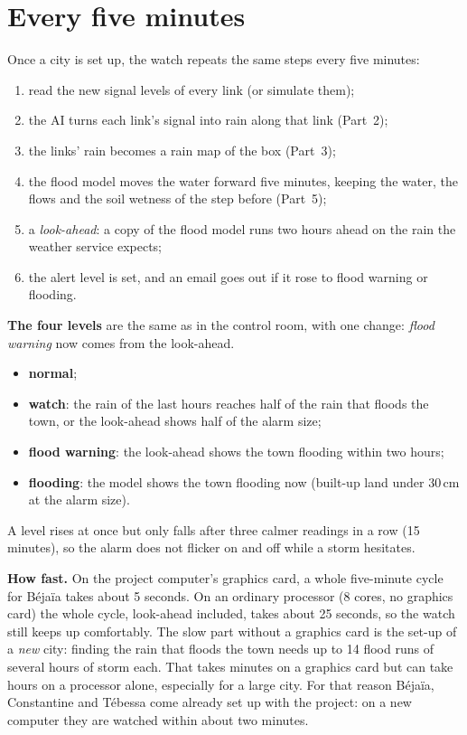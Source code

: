 \section{Every five minutes}
\label{sec:p7_cycle}
Once a city is set up, the watch repeats the same steps every five minutes:
\begin{enumerate}[itemsep=0.2em]
\item read the new signal levels of every link (or simulate them);
\item the AI turns each link's signal into rain along that link (Part~2);
\item the links' rain becomes a rain map of the box (Part~3);
\item the flood model moves the water forward five minutes, keeping the water, the flows and the soil wetness of the
step before (Part~5);
\item a \emph{look-ahead}: a copy of the flood model runs two hours ahead on the rain the weather service expects;
\item the alert level is set, and an email goes out if it rose to flood warning or flooding.
\end{enumerate}

\textbf{The four levels} are the same as in the control room, with one change: \emph{flood warning} now comes from the
look-ahead.
\begin{itemize}[itemsep=0.1em]
\item \textbf{normal};
\item \textbf{watch}: the rain of the last hours reaches half of the rain that floods the town, or the look-ahead shows
half of the alarm size;
\item \textbf{flood warning}: the look-ahead shows the town flooding within two hours;
\item \textbf{flooding}: the model shows the town flooding now (built-up land under 30\,cm at the alarm size).
\end{itemize}
A level rises at once but only falls after three calmer readings in a row (15 minutes), so the alarm does not flicker
on and off while a storm hesitates.

\textbf{How fast.} On the project computer's graphics card, a whole five-minute cycle for Béjaïa takes about 5 seconds.
On an ordinary processor (8 cores, no graphics card) the whole cycle, look-ahead included, takes about 25 seconds, so the
watch still keeps up comfortably. The slow part without a graphics card is the set-up of a \emph{new} city: finding the rain
that floods the town needs up to 14 flood runs of several hours of storm each. That takes minutes on a graphics card but
can take hours on a processor alone, especially for a large city. For that reason Béjaïa, Constantine and Tébessa come
already set up with the project: on a new computer they are watched within about two minutes.

